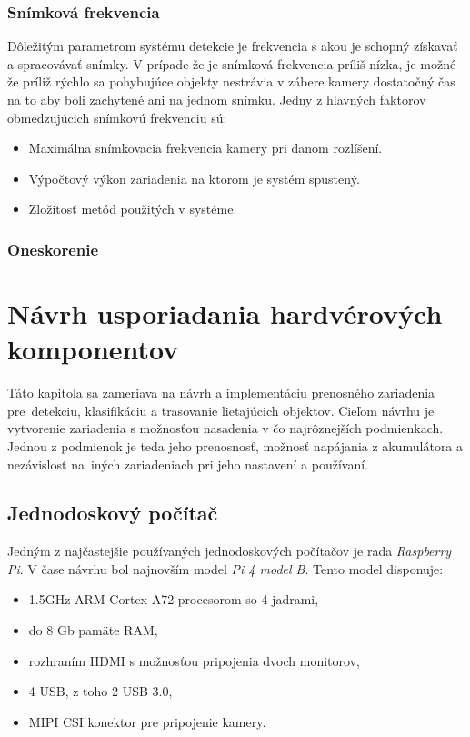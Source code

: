         \subsection{Snímková frekvencia}
            Dôležitým parametrom systému detekcie je frekvencia s akou je schopný získavať a spracovávať snímky. V prípade že je snímková frekvencia príliš nízka, je možné že príliž rýchlo sa pohybujúce objekty nestrávia v zábere kamery dostatočný čas na to aby boli zachytené ani na jednom snímku. Jedny z hlavných faktorov obmedzujúcich snímkovú frekvenciu sú:
            \begin{itemize}
                \item Maximálna snímkovacia frekvencia kamery pri danom rozlíšení.
                \item Výpočtový výkon zariadenia na ktorom je systém spustený.
                \item Zložitosť metód použitých v systéme.
            \end{itemize}
        \subsection{Oneskorenie}

\chapter{Návrh usporiadania hardvérových komponentov}

    Táto kapitola sa zameriava na návrh a implementáciu prenosného zariadenia pre~detekciu, klasifikáciu a trasovanie lietajúcich objektov. Cieľom návrhu je vytvorenie zariadenia s možnosťou nasadenia v čo najrôznejších podmienkach. Jednou z podmienok je teda jeho prenosnosť, možnosť napájania z akumulátora a nezávislosť na~iných zariadeniach pri jeho nastavení a používaní.

    \section{Jednodoskový počítač}
    
        Jedným z najčastejšie používaných jednodoskových počítačov je rada \emph{Raspberry Pi}. V čase návrhu bol najnovším model \emph{Pi 4 model B}. Tento model disponuje:
        \begin{itemize}
            \item 1.5GHz ARM Cortex-A72 procesorom so 4 jadrami,
            \item do 8 Gb pamäte RAM,
            \item rozhraním HDMI s možnosťou pripojenia dvoch monitorov,
            \item 4 USB, z toho 2 USB 3.0,
            \item MIPI CSI konektor pre pripojenie kamery.
        \end{itemize}

